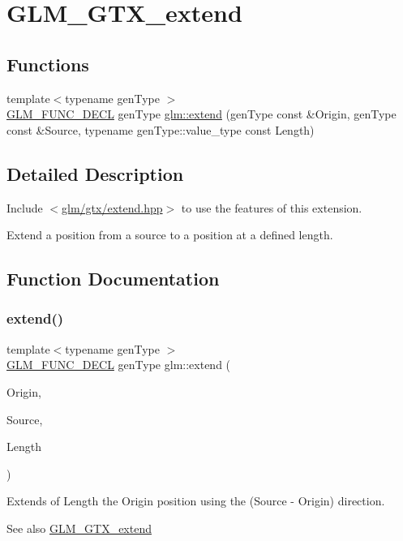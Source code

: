 \hypertarget{group__gtx__extend}{}\section{G\+L\+M\+\_\+\+G\+T\+X\+\_\+extend}
\label{group__gtx__extend}
\subsection*{Functions}
\begin{DoxyCompactItemize}
\item 
{\footnotesize template$<$typename gen\+Type $>$ }\\\mbox{\hyperlink{setup_8hpp_ab2d052de21a70539923e9bcbf6e83a51}{G\+L\+M\+\_\+\+F\+U\+N\+C\+\_\+\+D\+E\+CL}} gen\+Type \mbox{\hyperlink{group__gtx__extend_ga8140caae613b0f847ab0d7175dc03a37}{glm\+::extend}} (gen\+Type const \&Origin, gen\+Type const \&Source, typename gen\+Type\+::value\+\_\+type const Length)
\end{DoxyCompactItemize}


\subsection{Detailed Description}
Include $<$\mbox{\hyperlink{extend_8hpp}{glm/gtx/extend.\+hpp}}$>$ to use the features of this extension.

Extend a position from a source to a position at a defined length. 

\subsection{Function Documentation}
\mbox{\label{group__gtx__extend_ga8140caae613b0f847ab0d7175dc03a37}} 
\subsubsection{\texorpdfstring{extend()}{extend()}}
{\footnotesize\ttfamily template$<$typename gen\+Type $>$ \\
\mbox{\hyperlink{setup_8hpp_ab2d052de21a70539923e9bcbf6e83a51}{G\+L\+M\+\_\+\+F\+U\+N\+C\+\_\+\+D\+E\+CL}} gen\+Type glm\+::extend (\begin{DoxyParamCaption}\item[{gen\+Type const \&}]{Origin,  }\item[{gen\+Type const \&}]{Source,  }\item[{typename gen\+Type\+::value\+\_\+type const}]{Length }\end{DoxyParamCaption})}

Extends of Length the Origin position using the (Source -\/ Origin) direction. \begin{DoxySeeAlso}{See also}
\mbox{\hyperlink{group__gtx__extend}{G\+L\+M\+\_\+\+G\+T\+X\+\_\+extend}} 
\end{DoxySeeAlso}

